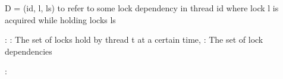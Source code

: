 \documentclass[landscape, a4paper]{article}
\begin{document}
\begin{minipage}[t]{0.195\linewidth}
	\raggedright
	\begin{betterlist}
		\item D = (id, l, ls) to refer to some lock dependency in thread id where lock l is acquired while holding locks ls
		\item {}: : The set of locks hold by thread t at a certain time, : The set of lock dependencies
		\item {}:


\end{betterlist}
\end{minipage}
\end{document}
